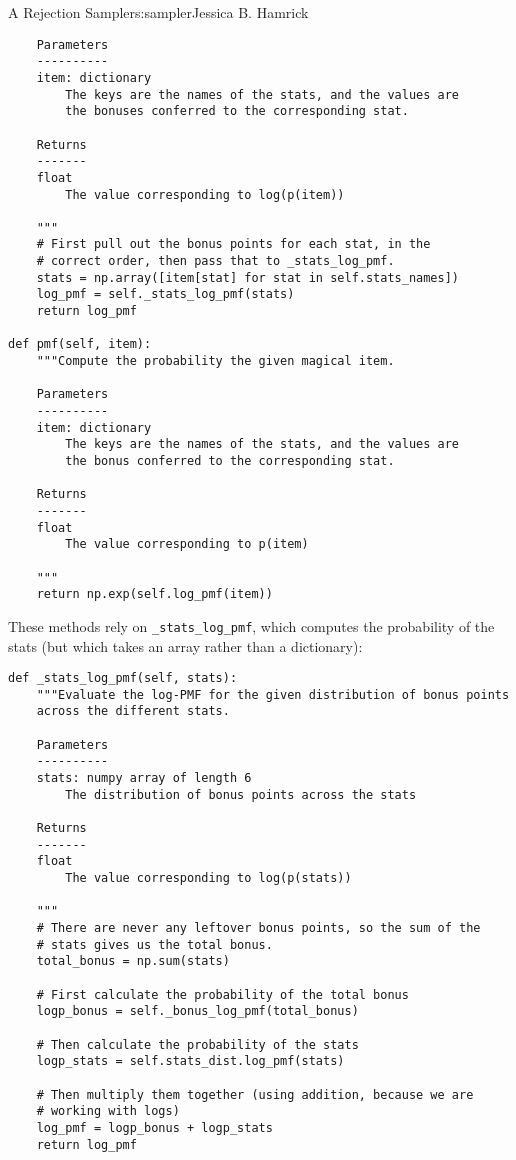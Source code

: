 \begin{aosachapter}{A Rejection Sampler}{s:sampler}{Jessica B. Hamrick}
\begin{verbatim}
    Parameters
    ----------
    item: dictionary
        The keys are the names of the stats, and the values are
        the bonuses conferred to the corresponding stat.

    Returns
    -------
    float
        The value corresponding to log(p(item))

    """
    # First pull out the bonus points for each stat, in the
    # correct order, then pass that to _stats_log_pmf.
    stats = np.array([item[stat] for stat in self.stats_names])
    log_pmf = self._stats_log_pmf(stats)
    return log_pmf

def pmf(self, item):
    """Compute the probability the given magical item.

    Parameters
    ----------
    item: dictionary
        The keys are the names of the stats, and the values are
        the bonus conferred to the corresponding stat.

    Returns
    -------
    float
        The value corresponding to p(item)

    """
    return np.exp(self.log_pmf(item))
\end{verbatim}

These methods rely on \texttt{\_stats\_log\_pmf}, which computes the
probability of the stats (but which takes an array rather than a
dictionary):

\begin{verbatim}
def _stats_log_pmf(self, stats):
    """Evaluate the log-PMF for the given distribution of bonus points
    across the different stats.

    Parameters
    ----------
    stats: numpy array of length 6
        The distribution of bonus points across the stats

    Returns
    -------
    float
        The value corresponding to log(p(stats))

    """
    # There are never any leftover bonus points, so the sum of the
    # stats gives us the total bonus.
    total_bonus = np.sum(stats)

    # First calculate the probability of the total bonus
    logp_bonus = self._bonus_log_pmf(total_bonus)

    # Then calculate the probability of the stats
    logp_stats = self.stats_dist.log_pmf(stats)

    # Then multiply them together (using addition, because we are
    # working with logs)
    log_pmf = logp_bonus + logp_stats
    return log_pmf
\end{verbatim}


\end{aosachapter}
